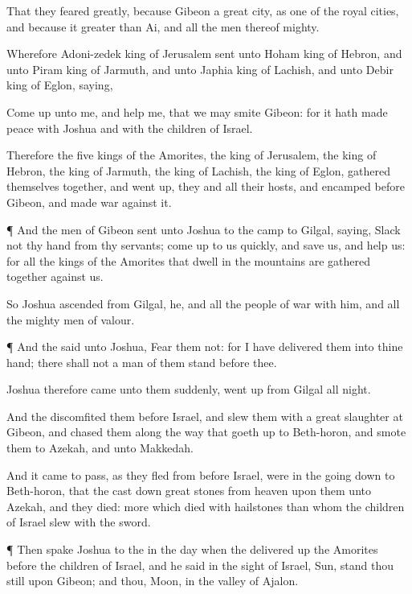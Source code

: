 {That they
feared
greatly, because
Gibeon
{} a
great
city, as
one of the
royal
cities, and because it
{}
greater than
Ai, and all the
men thereof
{}
mighty.

Wherefore
Adoni-zedek
king of
Jerusalem
sent unto
Hoham
king of
Hebron, and unto
Piram
king of
Jarmuth, and unto
Japhia
king of
Lachish, and unto
Debir
king of
Eglon,
saying,

Come
up unto me, and
help me, that we may
smite
Gibeon: for it hath made
peace with
Joshua and with the
children of
Israel.

Therefore the
five
kings of the
Amorites, the
king of
Jerusalem, the
king of
Hebron, the
king of
Jarmuth, the
king of
Lachish, the
king of
Eglon, gathered themselves
together, and went
up, they and all their
hosts, and
encamped before
Gibeon, and made
war against it.


\par }{\PP {}¶ And the
men of
Gibeon
sent unto
Joshua to the
camp to
Gilgal,
saying,
Slack not thy
hand from thy
servants; come
up to us
quickly, and
save us, and
help us: for all the
kings of the
Amorites that
dwell in the
mountains are gathered
together against us.


\par }{\PP {}So
Joshua
ascended from
Gilgal, he, and all the
people of
war with him, and all the
mighty men of
valour.


\par }{\PP {}¶ And the
{}
said unto
Joshua,
Fear them not: for I have
delivered them into thine
hand; there shall not a
man of them
stand
before thee.

Joshua therefore
came unto them
suddenly,
{} went
up from
Gilgal all
night.

And the
{}
discomfited them
before
Israel, and
slew them with a
great
slaughter at
Gibeon, and
chased them along the
way that goeth
up to
Beth-horon, and
smote them to
Azekah, and unto
Makkedah.

And it came to pass, as they
fled from
before
Israel,
{} were in the going
down to
Beth-horon, that the
{} cast
down
great
stones from
heaven upon them unto
Azekah, and they
died:
{}
more which
died with
hailstones than
{}
whom the
children of
Israel
slew with the
sword.


\par }{\PP {}¶ Then
spake
Joshua to the
{} in the
day when the
{} delivered
up the
Amorites
before the
children of
Israel, and he
said in the
sight of
Israel,
Sun, stand thou
still upon
Gibeon; and thou,
Moon, in the
valley of
Ajalon.

}
